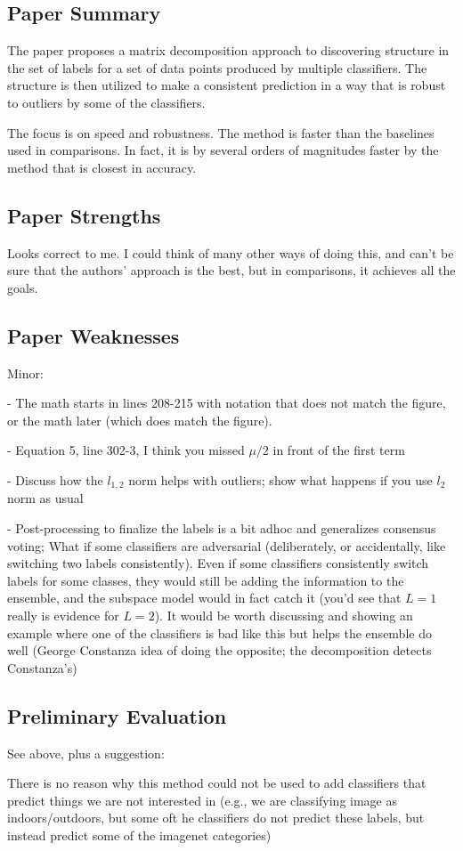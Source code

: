 \documentclass[letterpaper]{article}
\begin{document}
\subsection{Paper Summary}
The paper proposes a matrix decomposition approach to discovering structure in the set of labels for a set of data points produced by multiple classifiers. The structure is then utilized to make a consistent prediction in a way that is robust to outliers by some of the classifiers. 

The focus is on speed and robustness. The method is faster than the baselines used in comparisons. In fact, it is by several orders of magnitudes faster by the method that is closest in accuracy.

\subsection{Paper Strengths}
Looks correct to me. I could think of many other ways of doing this, and can't be sure that the authors' approach is the best, but in comparisons, it achieves all the goals.

\subsection{Paper Weaknesses}
Minor: 

- The math starts in lines 208-215 with notation that does not match the figure, or the math later (which does match the figure).

- Equation 5, line 302-3, I think you missed $\mu/2$ in front of the first term

- Discuss how the $l_{1,2}$ norm helps with outliers; show what happens if you use $l_2$ norm as usual

- Post-processing to finalize the labels is a bit adhoc and generalizes consensus voting; What if some classifiers are adversarial (deliberately, or accidentally, like switching two labels consistently). Even if some classifiers consistently switch labels for some classes, they would still be adding the information to the ensemble, and the subspace model would in fact catch it (you'd see that $L=1$ really is evidence for $L=2$). It would be worth discussing and showing an example where one of the classifiers is bad like this but helps the ensemble do well (George Constanza idea of doing the opposite; the decomposition detects Constanza's)

\subsection{Preliminary Evaluation}
See above, plus a suggestion:

There is no reason why this method could not be used to add classifiers that predict things we are not interested in (e.g., we are classifying image as indoors/outdoors, but some oft he classifiers do not predict these labels, but instead predict some of the imagenet categories)
\end{document}

